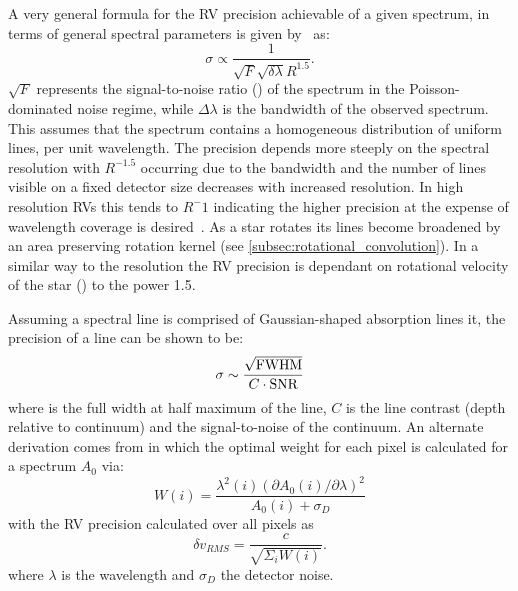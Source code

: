 A very general formula for the RV precision achievable of a given  spectrum, in terms of general spectral parameters is given by~\citet{hatzes_spectrograph_1992} as:
\begin{equation}
\sigma \propto \frac{1}{\sqrt{F} \sqrt{\delta \lambda} R^{1.5}}.
\end{equation}
$\sqrt{F}$ represents the signal-to-noise ratio (\snr{}) of the spectrum in the Poisson-dominated noise regime, while $\Delta \lambda$ is the bandwidth of the observed spectrum. This assumes that the spectrum contains a homogeneous distribution of uniform lines, per unit wavelength.
The precision depends more steeply on the spectral resolution with $R^{-1.5}$ occurring due  to the bandwidth and the number of lines visible on  a fixed detector size decreases with increased resolution.
In high resolution RVs this tends to $R^-{1}$ indicating the higher precision at the expense of wavelength coverage is desired~\citet{hatzes_spectrograph_1992}.
As a star rotates its lines become broadened by an area preserving rotation kernel (see \cref{subsec:rotational_convolution}).
In a similar way to the resolution the RV precision is dependant on rotational velocity of the star (\Vsini) to the power 1.5.

Assuming a spectral line is comprised of Gaussian-shaped absorption lines it, the precision of a line can be shown to be:
\begin{equation}
    \sigma\sim\frac{\sqrt{\textrm{FWHM}{}}}{C \cdot \textrm{SNR}}
\end{equation}
where \fwhm{} is the full width at half maximum of the line, $C$ is the line contrast (depth relative to continuum) and \snr{} the signal-to-noise of the continuum.
An alternate derivation comes from \citet{bouchy_fundamental_2001} in which the optimal weight for each pixel is calculated for a spectrum $A_0$ via:
\begin{equation}
    W(i) = \frac{\lambda^{2}(i) {(\partial A_0(i)/\partial\lambda)}^{2}}{A_0(i) + \sigma_D} \label{eqn:pixel_weigth}
\end{equation}
with the RV precision calculated over all pixels as
\begin{equation}
    \delta v_{RMS} = \frac{c}{\sqrt{\Sigma_i W(i)}}.
\end{equation}
where $\lambda$ is the wavelength and $\sigma_D$ the detector noise.

